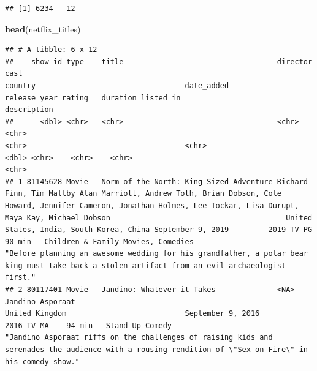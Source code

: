 \documentclass[
]{article}
\newenvironment{Shaded}{\begin{snugshade}}{\end{snugshade}}
\newcommand{\KeywordTok}[1]{\textcolor[rgb]{0.13,0.29,0.53}{\textbf{#1}}}
\newcommand{\NormalTok}[1]{#1}
\begin{document}
\begin{verbatim}
## [1] 6234   12
\end{verbatim}

\begin{Shaded}
\begin{Highlighting}[]
\KeywordTok{head}\NormalTok{(netflix_titles)}
\end{Highlighting}
\end{Shaded}

\begin{verbatim}
## # A tibble: 6 x 12
##    show_id type    title                                   director                 cast                                                                                                                                                                               country                                  date_added        release_year rating   duration listed_in                                                         description                                                                                                                                           
##      <dbl> <chr>   <chr>                                   <chr>                    <chr>                                                                                                                                                                              <chr>                                    <chr>                    <dbl> <chr>    <chr>    <chr>                                                             <chr>                                                                                                                                                 
## 1 81145628 Movie   Norm of the North: King Sized Adventure Richard Finn, Tim Maltby Alan Marriott, Andrew Toth, Brian Dobson, Cole Howard, Jennifer Cameron, Jonathan Holmes, Lee Tockar, Lisa Durupt, Maya Kay, Michael Dobson                                        United States, India, South Korea, China September 9, 2019         2019 TV-PG    90 min   Children & Family Movies, Comedies                                "Before planning an awesome wedding for his grandfather, a polar bear king must take back a stolen artifact from an evil archaeologist first."        
## 2 80117401 Movie   Jandino: Whatever it Takes              <NA>                     Jandino Asporaat                                                                                                                                                                   United Kingdom                           September 9, 2016         2016 TV-MA    94 min   Stand-Up Comedy                                                   "Jandino Asporaat riffs on the challenges of raising kids and serenades the audience with a rousing rendition of \"Sex on Fire\" in his comedy show." 

\end{verbatim}
\end{document}
